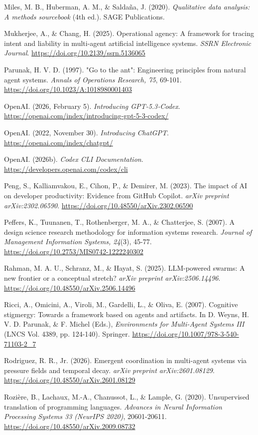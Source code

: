 \documentclass[12pt,a4paper]{article}
\begin{document}
Miles, M. B., Huberman, A. M., \& Saldaña, J. (2020). \emph{Qualitative
data analysis: A methods sourcebook} (4th ed.). SAGE Publications.

Mukherjee, A., \& Chang, H. (2025). Operational agency: A framework for
tracing intent and liability in multi-agent artificial intelligence
systems. \emph{SSRN Electronic Journal}.
\url{https://doi.org/10.2139/ssrn.5136065}

Parunak, H. V. D. (1997). "Go to the ant": Engineering principles from
natural agent systems. \emph{Annals of Operations Research, 75}, 69-101.
\url{https://doi.org/10.1023/A:1018980001403}

OpenAI. (2026, February 5). \emph{Introducing GPT‑5.3‑Codex}.
\url{https://openai.com/index/introducing-gpt-5-3-codex/}

OpenAI. (2022, November 30). \emph{Introducing ChatGPT}.
\url{https://openai.com/index/chatgpt/}

OpenAI. (2026b). \emph{Codex CLI Documentation}.
\url{https://developers.openai.com/codex/cli}

Peng, S., Kalliamvakou, E., Cihon, P., \& Demirer, M. (2023). The impact
of AI on developer productivity: Evidence from GitHub Copilot.
\emph{arXiv preprint arXiv:2302.06590}.
\url{https://doi.org/10.48550/arXiv.2302.06590}

Peffers, K., Tuunanen, T., Rothenberger, M. A., \& Chatterjee, S.
(2007). A design science research methodology for information systems
research. \emph{Journal of Management Information Systems, 24}(3),
45-77. \url{https://doi.org/10.2753/MIS0742-1222240302}

Rahman, M. A. U., Schranz, M., \& Hayat, S. (2025). LLM-powered swarms:
A new frontier or a conceptual stretch? \emph{arXiv preprint
arXiv:2506.14496}. \url{https://doi.org/10.48550/arXiv.2506.14496}

Ricci, A., Omicini, A., Viroli, M., Gardelli, L., \& Oliva, E. (2007).
Cognitive stigmergy: Towards a framework based on agents and artifacts.
In D. Weyns, H. V. D. Parunak, \& F. Michel (Eds.), \emph{Environments
for Multi-Agent Systems III} (LNCS Vol. 4389, pp. 124-140). Springer.
\url{https://doi.org/10.1007/978-3-540-71103-2_7}

Rodriguez, R. R., Jr. (2026). Emergent coordination in multi-agent
systems via pressure fields and temporal decay. \emph{arXiv preprint
arXiv:2601.08129}. \url{https://doi.org/10.48550/arXiv.2601.08129}

Rozière, B., Lachaux, M.-A., Chanussot, L., \& Lample, G. (2020).
Unsupervised translation of programming languages. \emph{Advances in
Neural Information Processing Systems 33 (NeurIPS 2020)}, 20601-20611.
\url{https://doi.org/10.48550/arXiv.2009.08732}
\end{document}
